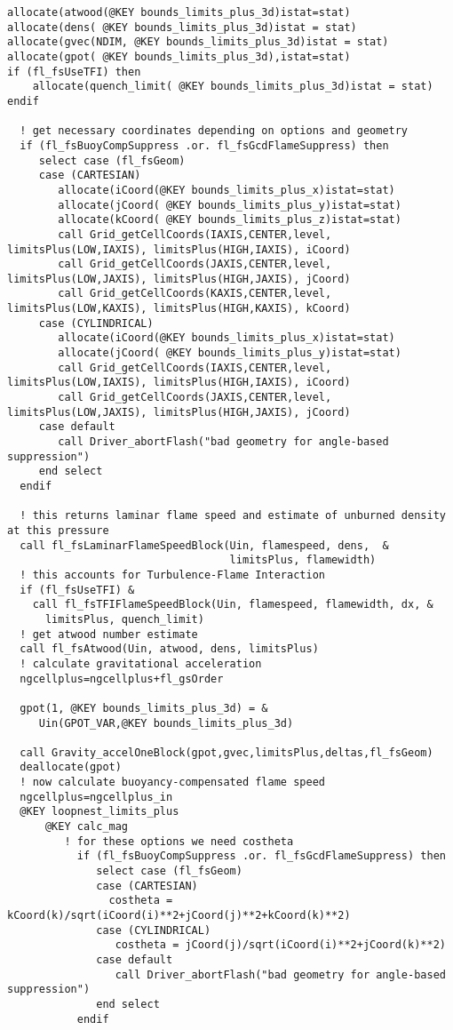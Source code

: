 \documentclass{article}
\begin{document}
\begin{verbatim}
allocate(atwood(@KEY bounds_limits_plus_3d)istat=stat)
allocate(dens( @KEY bounds_limits_plus_3d)istat = stat)
allocate(gvec(NDIM, @KEY bounds_limits_plus_3d)istat = stat)
allocate(gpot( @KEY bounds_limits_plus_3d),istat=stat)
if (fl_fsUseTFI) then
    allocate(quench_limit( @KEY bounds_limits_plus_3d)istat = stat)
endif

  ! get necessary coordinates depending on options and geometry
  if (fl_fsBuoyCompSuppress .or. fl_fsGcdFlameSuppress) then
     select case (fl_fsGeom)
     case (CARTESIAN)
        allocate(iCoord(@KEY bounds_limits_plus_x)istat=stat)
        allocate(jCoord( @KEY bounds_limits_plus_y)istat=stat)
        allocate(kCoord( @KEY bounds_limits_plus_z)istat=stat)
        call Grid_getCellCoords(IAXIS,CENTER,level, limitsPlus(LOW,IAXIS), limitsPlus(HIGH,IAXIS), iCoord)
        call Grid_getCellCoords(JAXIS,CENTER,level, limitsPlus(LOW,JAXIS), limitsPlus(HIGH,JAXIS), jCoord)
        call Grid_getCellCoords(KAXIS,CENTER,level, limitsPlus(LOW,KAXIS), limitsPlus(HIGH,KAXIS), kCoord)
     case (CYLINDRICAL)
        allocate(iCoord(@KEY bounds_limits_plus_x)istat=stat)
        allocate(jCoord( @KEY bounds_limits_plus_y)istat=stat)
        call Grid_getCellCoords(IAXIS,CENTER,level, limitsPlus(LOW,IAXIS), limitsPlus(HIGH,IAXIS), iCoord)
        call Grid_getCellCoords(JAXIS,CENTER,level, limitsPlus(LOW,JAXIS), limitsPlus(HIGH,JAXIS), jCoord)
     case default
        call Driver_abortFlash("bad geometry for angle-based suppression")
     end select
  endif

  ! this returns laminar flame speed and estimate of unburned density at this pressure
  call fl_fsLaminarFlameSpeedBlock(Uin, flamespeed, dens,  &
                                   limitsPlus, flamewidth)
  ! this accounts for Turbulence-Flame Interaction
  if (fl_fsUseTFI) &
    call fl_fsTFIFlameSpeedBlock(Uin, flamespeed, flamewidth, dx, &
      limitsPlus, quench_limit)
  ! get atwood number estimate
  call fl_fsAtwood(Uin, atwood, dens, limitsPlus)
  ! calculate gravitational acceleration
  ngcellplus=ngcellplus+fl_gsOrder

  gpot(1, @KEY bounds_limits_plus_3d) = &
     Uin(GPOT_VAR,@KEY bounds_limits_plus_3d)

  call Gravity_accelOneBlock(gpot,gvec,limitsPlus,deltas,fl_fsGeom)
  deallocate(gpot)
  ! now calculate buoyancy-compensated flame speed
  ngcellplus=ngcellplus_in
  @KEY loopnest_limits_plus
      @KEY calc_mag
         ! for these options we need costheta
           if (fl_fsBuoyCompSuppress .or. fl_fsGcdFlameSuppress) then
              select case (fl_fsGeom)
              case (CARTESIAN)
                costheta = kCoord(k)/sqrt(iCoord(i)**2+jCoord(j)**2+kCoord(k)**2)
              case (CYLINDRICAL)
                 costheta = jCoord(j)/sqrt(iCoord(i)**2+jCoord(k)**2)
              case default
                 call Driver_abortFlash("bad geometry for angle-based suppression")
              end select
           endif


\end{verbatim}
\end{document}
